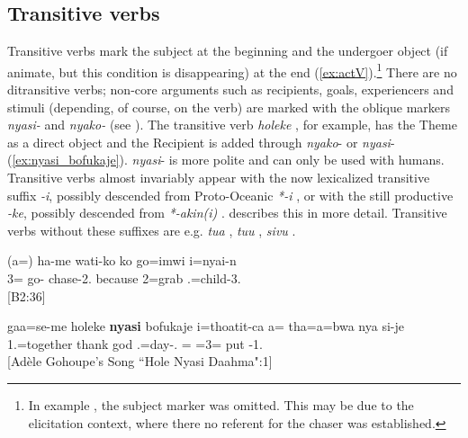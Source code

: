 \subsection{Transitive verbs}
\label{ssec:TransV}
Transitive verbs mark the subject at the beginning and the undergoer object (if animate, but this condition is disappearing) at the end (\ref{ex:actV}).\footnote{In example , the subject marker was omitted. This may be due to the elicitation context, where there no referent for the chaser was established. } There are no ditransitive verbs; non-core arguments such as recipients, goals, experiencers and stimuli (depending, of course, on the verb) are marked with the oblique markers \textit{nyasi-} and \textit{nyako-} (see ). The transitive verb \textit{holeke} , for example, has the Theme as a direct object and the Recipient is added through \textit{nyako}- or \textit{nyasi}- (\ref{ex:nyasi_bofukaje}). \textit{nyasi}- is more polite and can only be used with humans. Transitive verbs almost invariably appear with the now lexicalized transitive suffix \textit{-i}, possibly descended from Proto-Oceanic \textit{*-i} \parencite[507]{ross_morphosyntactic_2004}, or with the still productive \textit{-ke}, possibly descended from \textit{*-akin(i)} \parencite[507]{ross_morphosyntactic_2004}.  describes this in more detail. Transitive verbs without these suffixes are e.g. \textit{tua} , \textit{tuu} , \textit{sivu} .

\ea \label{ex:actV}\gll (a=) ha-me wati-ko ko go=imwi i=nyai-n\\
 3= go- chase-2. because 2=grab .=child-3.\\
\glt {} {[B2:36]}
\z

\ea \label{ex:nyasi_bofukaje}\gll gaa=se-me holeke \textbf{nyasi} bofukaje i=thoatit-ca a= tha=a=bwa nya si-je\\
 1.=together thank  god .=day-. = =3= put -1.\\
\glt {} {[Adèle Gohoupe's Song ``Hole Nyasi Daahma":1]}
\z 



